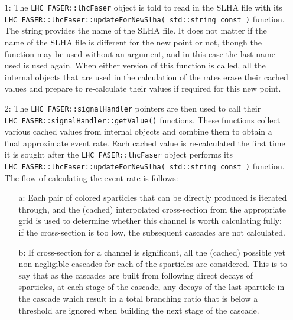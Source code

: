 \documentclass[10pt]{article}
\newcommand{\lf}[1]{\texttt{LHC\_FASER::#1}}
\begin{document}
\begin{itemize}

\item[1:] The \lf{lhcFaser} object is told to read in the SLHA file with its
          \lf{lhcFaser::updateForNewSlha( std::string const )} function. The
          string provides the name of the SLHA file. It does not matter if the
          name of the SLHA file is different for the new point or not, though
          the function may be used without an argument, and in this case the
          last name used is used again.
          When either version of this function is called, all the internal
          objects that are used in the calculation of the rates erase their
          cached values and prepare to re-calculate their values if required for
          this new point.

\item[2:] The \lf{signalHandler} pointers are then used to call their\\
          \lf{signalHandler::getValue()} functions. These functions collect
          various cached values from internal objects and combine them to obtain
          a final approximate event rate. Each cached value is re-calculated the
          first time it is sought after the \lf{lhcFaser} object performs its\\
          \lf{lhcFaser::updateForNewSlha( std::string const )} function.
          The flow of calculating the event rate is follows:

  \begin{itemize}

  \item[a:] Each pair of colored sparticles that can be directly produced is
            iterated through, and the (cached) interpolated cross-section from
            the appropriate grid is used to determine whether this channel is
            worth calculating fully: if the cross-section is too low, the
            subsequent cascades are not calculated.

  \item[b:] If cross-section for a channel is significant, all the (cached)
            possible yet non-negligible cascades for each of the sparticles are
            considered.
            This is to say that as the cascades are built from following direct
            decays of sparticles, at each stage of the cascade, any decays of
            the last sparticle in the cascade which result in a total branching
            ratio that is below a threshold are ignored when building the next
            stage of the cascade.


\end{itemize}
\end{itemize}
\end{document}
